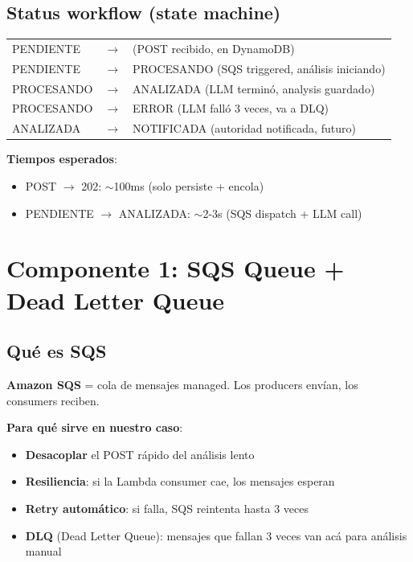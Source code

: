 \documentclass[11pt,a4paper,oneside]{article}
\begin{document}
\subsection{Status workflow (state machine)}

\begin{center}
\begin{tabular}{lcl}
PENDIENTE & $\rightarrow$ & (POST recibido, en DynamoDB) \\
PENDIENTE & $\rightarrow$ & PROCESANDO (SQS triggered, an\'alisis iniciando) \\
PROCESANDO & $\rightarrow$ & ANALIZADA (LLM termin\'o, analysis guardado) \\
PROCESANDO & $\rightarrow$ & ERROR (LLM fall\'o 3 veces, va a DLQ) \\
ANALIZADA & $\rightarrow$ & NOTIFICADA (autoridad notificada, futuro) \\
\end{tabular}
\end{center}

\textbf{Tiempos esperados}:
\begin{itemize}
  \item POST $\rightarrow$ 202: $\sim$100ms (solo persiste + encola)
  \item PENDIENTE $\rightarrow$ ANALIZADA: $\sim$2-3s (SQS dispatch + LLM call)
\end{itemize}

\section{Componente 1: SQS Queue + Dead Letter Queue}

\subsection{Qu\'e es SQS}

\textbf{Amazon SQS} = cola de mensajes managed. Los producers env\'ian, los consumers reciben.

\textbf{Para qu\'e sirve en nuestro caso}:
\begin{itemize}
  \item \textbf{Desacoplar} el POST r\'apido del an\'alisis lento
  \item \textbf{Resiliencia}: si la Lambda consumer cae, los mensajes esperan
  \item \textbf{Retry autom\'atico}: si falla, SQS reintenta hasta 3 veces
  \item \textbf{DLQ} (Dead Letter Queue): mensajes que fallan 3 veces van ac\'a para an\'alisis manual
\end{itemize}
\end{document}
